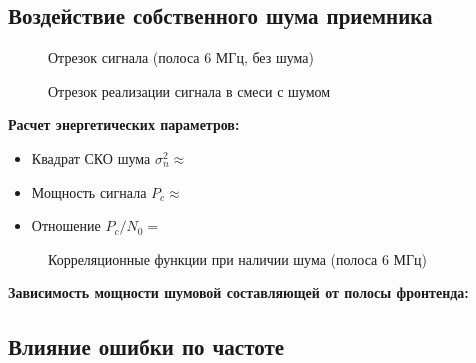 \subsection{Воздействие собственного шума приемника}

\begin{figure}[H]
    \centering
    \caption{Отрезок сигнала (полоса 6 МГц, без шума)}
\end{figure}

\begin{figure}[H]
    \centering
    \caption{Отрезок реализации сигнала в смеси с шумом}
\end{figure}

\textbf{Расчет энергетических параметров:}
\begin{itemize}
    \item Квадрат СКО шума $\sigma_n^2 \approx $ %
    \item Мощность сигнала $P_c \approx $ %
    \item Отношение $P_c / N_0 = $ %
\end{itemize}

\begin{figure}[H]
    \centering
    \caption{Корреляционные функции при наличии шума (полоса 6 МГц)}
\end{figure}

\textbf{Зависимость мощности шумовой составляющей от полосы фронтенда:}\\

\subsection{Влияние ошибки по частоте}

